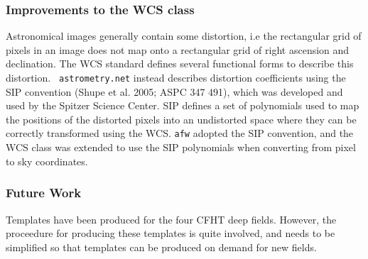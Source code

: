 %

\subsubsection{Improvements to the WCS class}
Astronomical images generally contain some distortion, i.e the
rectangular grid of pixels in an image does not map onto a rectangular
grid of right ascension and declination. The WCS standard defines
several functional forms to describe this distortion.  {\tt
  astrometry.net} instead describes distortion coefficients using the SIP
convention (Shupe et al. 2005; ASPC 347 491), which was developed and
used by the Spitzer Science Center. SIP defines a set of polynomials
used to map the positions of the distorted pixels into an undistorted
space where they can be correctly transformed using the WCS. {\tt afw}
adopted the SIP convention, and the WCS class was extended to use the
SIP polynomials when converting from pixel to sky coordinates.


\subsubsection{Future Work}
Templates have been produced for the four CFHT deep fields. However, the proceedure for producing these templates is quite involved, and needs to be simplified so that templates can be produced on demand for new fields.
